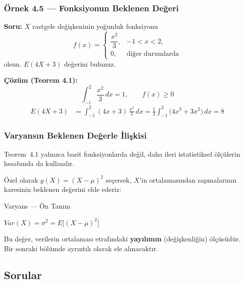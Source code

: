 \documentclass[light]{lutbeamer}
\begin{document}
\begin{frame}[fragile]
  \frametitle[Örnek 4.5]{Örnek 4.5 --- Fonksiyonun Beklenen Değeri}

  \smallskip
  \textbf{Soru:} $X$ rastgele değişkeninin yoğunluk fonksiyonu
  \[
    f(x)=
    \begin{cases}
      \dfrac{x^2}{3}, & -1<x<2,\\[2pt]
      0, & \text{diğer durumlarda}
    \end{cases}
  \]
  olsun. $E(4X+3)$ değerini bulunuz.

  \medskip
  \textbf{Çözüm (Teorem 4.1):}
  \[
    \int_{-1}^{2}\frac{x^2}{3}\,dx = 1,\qquad f(x)\ge 0
  \]
  \begin{align*}
    E(4X+3) &= \int_{-1}^{2} (4x+3)\,\frac{x^2}{3}\,dx = \frac{1}{3}\int_{-1}^{2}\bigl(4x^3 + 3x^2\bigr)\,dx = 8
  \end{align*}
\end{frame}


\begin{frame}[fragile]
  \frametitle{Varyansın Beklenen Değerle İlişkisi}
  Teorem~4.1 yalnızca basit fonksiyonlarda değil, daha ileri istatistiksel ölçülerin hesabında da kullanılır.

  \medskip
  Özel olarak $g(X) = (X - \mu)^2$ seçersek, $X$'in ortalamasından sapmalarının karesinin beklenen değerini elde ederiz:
  \begin{center}
    \begin{minipage}{0.7\textwidth}
      \begin{block}{Varyans --- Ön Tanım}
        \begin{center}
          $Var(X) = \sigma^2 = E\bigl[(X-\mu)^2\bigr]$
        \end{center}
      \end{block}
    \end{minipage}
  \end{center}
  Bu değer, verilerin ortalaması etrafındaki \textbf{yayılımın} (değişkenliğin) ölçüsüdür. Bir sonraki bölümde ayrıntılı olarak ele alınacaktır.
\end{frame}

\subsection{Sorular}
\end{document}
